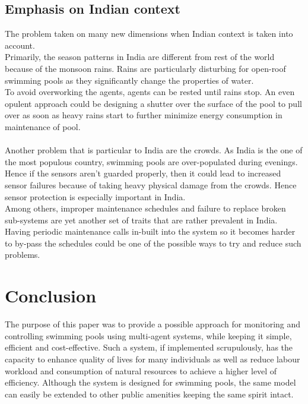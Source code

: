 \documentclass[12pt]{article}
\begin{document}
    \subsection{Emphasis on Indian context}
    The problem taken on many new dimensions when Indian context is taken into account.\\
    Primarily, the season patterns in India are different from rest of the world because of the monsoon rains. Rains are particularly disturbing for open-roof swimming pools as they significantly change the properties of water.\\
    To avoid overworking the agents, agents can be rested until rains stop. An even opulent approach could be designing a shutter over the surface of the pool to pull over as soon as heavy rains start to further minimize energy consumption in maintenance of pool.\\
    \\
    Another problem that is particular to India are the crowds. As India is the one of the most populous country, swimming pools are over-populated during evenings. Hence if the sensors aren't guarded properly, then it could lead to increased sensor failures because of taking heavy physical damage from the crowds. Hence sensor protection is especially important in India.\\
    Among others, improper maintenance schedules and failure to replace broken sub-systems are yet another set of traits that are rather prevalent in India. Having periodic maintenance calls in-built into the system so it becomes harder to by-pass the schedules could be one of the possible ways to try and reduce such problems.
    
\section{Conclusion}
The purpose of this paper was to provide a possible approach for monitoring and controlling swimming pools using multi-agent systems, while keeping it simple, efficient and cost-effective. Such a system, if implemented scrupulously, has the capacity to enhance quality of lives for many individuals as well as reduce labour workload and consumption of natural resources to achieve a higher level of efficiency. Although the system is designed for swimming pools, the same model can easily be extended to other public amenities keeping the same spirit intact. 
\end{document}
